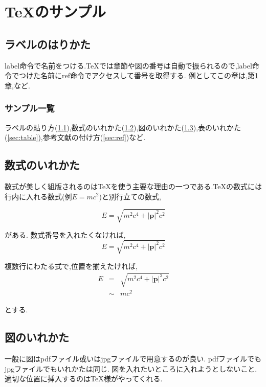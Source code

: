 \chapter{\TeX のサンプル}\label{sample}

\section{ラベルのはりかた}\label{sec:label}
label命令で名前をつける.\TeX では章節や図の番号は自動で振られるので,label命令でつけた名前にref命令でアクセスして番号を取得する.
例としてこの章は,第\ref{sample}章,など.

\subsection{サンプル一覧}\label{sec:list}
ラベルの貼り方(\ref{sec:label}),数式のいれかた(\ref{sec:eq}),図のいれかた(\ref{sec:figure}),表のいれかた(\ref{sec:table}),参考文献の付け方(\ref{sec:ref})など.

\section{数式のいれかた}\label{sec:eq}
数式が美しく組版されるのは\TeX を使う主要な理由の一つである.\TeX の数式には行内に入れる数式(例$E=mc^2$)と別行立ての数式,

\begin{equation}
	\label{eq:test1}
	E = \sqrt{m^2 c^4 +|\bm{p}|^2 c^2}
\end{equation}

がある.
数式番号を入れたくなければ,
\begin{equation}
	\nonumber
	\label{eq:test1}
	E = \sqrt{m^2 c^4 +|\bm{p}|^2 c^2}
\end{equation}

複数行にわたる式で,位置を揃えたければ,
\begin{eqnarray}
	\nonumber
	E & =    & \sqrt{m^2 c^4 +|\bm{p}|^2 c^2} \\
	  & \sim & mc^2
\end{eqnarray}

とする.

\section{図のいれかた}\label{sec:figure}

一般に図はpdfファイル或いはjpgファイルで用意するのが良い.
pdfファイルでもjpgファイルでもいれかたは同じ.
図を入れたいところに入れようとしないこと.
適切な位置に挿入するのは\TeX 様がやってくれる.



